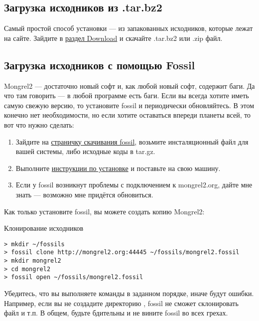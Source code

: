 \subsection{Загрузка исходников из .tar.bz2}

Самый простой способ установки --- из запакованных исходников, которые лежат на сайте.
Зайдите в \href{http://mongrel2.org/home#download}{раздел Download} и скачайте .tar.bz2 или .zip файл.

\subsection{Загрузка исходников с помощью Fossil}

Mongrel2 --- достаточно новый софт и, как любой новый софт, содержит баги. Да что там
говорить --- в любой программе есть баги. Если вы всегда хотите иметь самую свежую
версию, то установите fossil и периодически обновляйтесь. В этом конечно нет
необходимости, но если хотите оставаться впереди планеты всей, то вот что нужно сделать:

\begin{enumerate}
\item Зайдите на \href{http://www.fossil-scm.org/download.html}{страничку скачивания fossil},
    возьмите инсталяционный файл для вашей системы, либо исходные коды в tar.gz. 
\item Выполните \href{http://fossil-scm.org/index.html/doc/tip/www/build.wiki}{инструкции по установке}
    и поставьте на свою машину.
\item Если у fossil возникнут проблемы с подключением к mongrel2.org, дайте мне знать ---
    возможно мне придётся обновиться.
\end{enumerate}

Как только установите fossil, вы можете создать копию Mongrel2:

\begin{code}{Клонирование исходников}
\begin{lstlisting}
> mkdir ~/fossils
> fossil clone http://mongrel2.org:44445 ~/fossils/mongrel2.fossil
> mkdir mongrel2
> cd mongrel2
> fossil open ~/fossils/mongrel2.fossil
\end{lstlisting}
\end{code}

Убедитесь, что вы выполняете команды в заданном порядке, иначе будут ошибки.
Например, если вы не создадите директорию ,
fossil не сможет склонировать файл и т.п. В общем, будьте бдительны и не вините fossil
во всех грехах.

